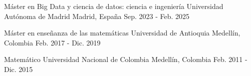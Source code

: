 
\begin{cventries}

\cventry
{Máster en Big Data y ciencia de datos: ciencia e ingeniería}
{Universidad Autónoma de Madrid}
{Madrid, España}
{Sep. 2023 - Feb. 2025}
{}

\cventry
{Máster en enseñanza de las matemáticas}
{Universidad de Antioquia}
{Medellín, Colombia}
{Feb. 2017 - Dic. 2019}
{}

\cventry
{Matemático}
{Universidad Nacional de Colombia}
{Medellín, Colombia}
{Feb. 2011 - Dic. 2015}
{}

\end{cventries}
